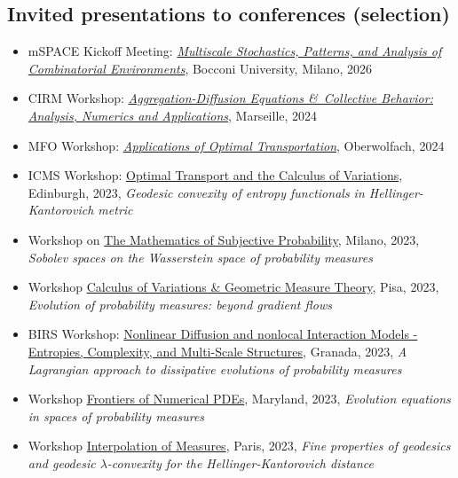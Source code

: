 \documentclass[reqno,11pt]{article}
\newcommand{\workshop}[4]{#1, #2, #3, {\em #4}}
\theoremstyle{plain}
\begin{document}
\subsection*{Invited presentations to conferences (selection)}
\newcommand{\noemph}[1]{#1}
\begin{itemize}[topsep=-0.5\parsep,itemsep=-4pt,leftmargin=*] 
  \renewcommand{\labelitemi}{--}
  \item mSPACE Kickoff Meeting:
  \href{https://bidsa.unibocconi.eu/multiscale-stochastics-patterns-and-analysis-combinatorial-environments}{\em Multiscale Stochastics, Patterns, and Analysis of Combinatorial Environments}, Bocconi University, Milano, 2026
  \item CIRM Workshop:
  \href{https://conferences.cirm-math.fr/3049.html}{\em Aggregation-Diffusion Equations \&\ Collective Behavior:
Analysis, Numerics and Applications}, Marseille, 2024
\item 
  MFO Workshop: 
\href{https://www.mfo.de/occasion/2406/www_view}{\em Applications of
    Optimal Transportation}, Oberwolfach, {2024}
  \item 
  \workshop{ICMS Workshop:   \href{https://www.icms.org.uk/workshops/2023/optimal-transport-and-calculus-variations}{Optimal Transport and the Calculus of Variations}}{Edinburgh}{2023}{Geodesic convexity of entropy functionals in Hellinger-Kantorovich metric}
  \item 
  \workshop{Workshop on 
  \href{https://www.msp2023.campus.unimib.it}{The Mathematics of Subjective Probability}}{Milano}{2023}{Sobolev spaces on the Wasserstein space of probability measures}
  \item 
  \workshop{Workshop \href{https://events.dm.unipi.it/event/77}{Calculus of Variations \& Geometric Measure Theory}}{Pisa}{2023}{Evolution of probability measures: beyond gradient flows}
  \item 
  \workshop{BIRS Workshop: \href{https://www.birs.ca/events/2023/5-day-workshops/23w6003}{Nonlinear Diffusion and nonlocal Interaction Models - Entropies, Complexity, and Multi-Scale Structures}}{Granada}{2023}{A Lagrangian approach to dissipative evolutions of probability measures}
  \item \workshop{Workshop \href{https://brinmrc.umd.edu/programs/workshops/spring23/spring23-workshop-numerics.html}{\noemph{Frontiers of Numerical PDEs}}}{Maryland}{2023}{Evolution equations in spaces of probability measures}
  \item \workshop{Workshop \href{https://sites.google.com/view/ot-lagrange/barycenters-interpolation-harmonic-maps?authuser=0}{\noemph{Interpolation of Measures}}}{Paris}{2023}{Fine properties of geodesics and geodesic $\lambda$-convexity for the Hellinger-Kantorovich distance}

\end{itemize}
\end{document}
